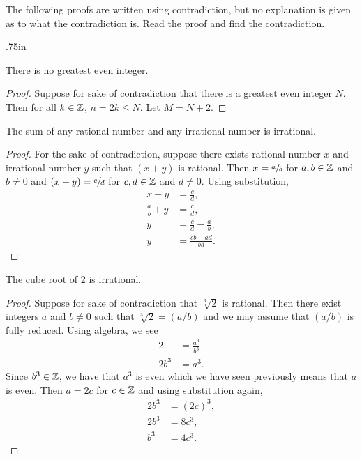 \begin{question}[resume]
\item The following proofs are written using contradiction, but no explanation is given as to what the contradiction is.  Read the proof and find the contradiction.
	\begin{qpart} \itemsep.75in
	\item There is no greatest even integer.
		\begin{proof}  Suppose for sake of contradiction that there is a greatest even integer $N$.  Then for all $k \in \mathbb{Z}$, $n=2k \leq N$.  Let $M = N+2$.
		\end{proof}
	\item The sum of any rational number and any irrational number is irrational.
		\begin{proof}  For the sake of contradiction, suppose there exists rational number $x$ and irrational number $y$ such that $(x+y)$ is rational.  Then $x =\sfrac{a}{b}$ for $a,b \in \mathbb{Z}$ and $b \neq 0$ and $(x+y) = \sfrac{c}{d}$ for $c,d \in \mathbb{Z}$ and $d \neq 0$.  Using substitution, 
			\begin{align*}
			x+y &= \frac{c}{d},\\
			\frac{a}{b} +y &= \frac{c}{d},\\
			y &= \frac{c}{d}-\frac{a}{b}, \\
			y &= \frac{cb-ad}{bd}.
			\end{align*}
		\end{proof}
	\item The cube root of 2 is irrational.
	\begin{proof} Suppose for sake of contradiction that $\sqrt[3]{2}$ is rational.  Then there exist integers $a$ and $b \neq 0$ such that $\sqrt[3]{2} = (a/b)$ and we may assume that $(a/b)$ is fully reduced.  Using algebra, we see
	\begin{align*}
	2 &= \frac{a^3}{b^3} \\
	2b^3 &= a^3.
	\end{align*}
	Since $b^3 \in \mathbb{Z}$, we have that $a^3$ is even which we have seen previously means that $a$ is even.  Then $a = 2c$ for $c \in \mathbb{Z}$ and using substitution again,
	\begin{align*}
	2b^3 &= (2c)^3, \\
	2b^3 &= 8c^3, \\
	b^3 &= 4c^3.
	\end{align*}
	\end{proof}
	\vspace{.75in}
	\end{qpart}



\end{question}
